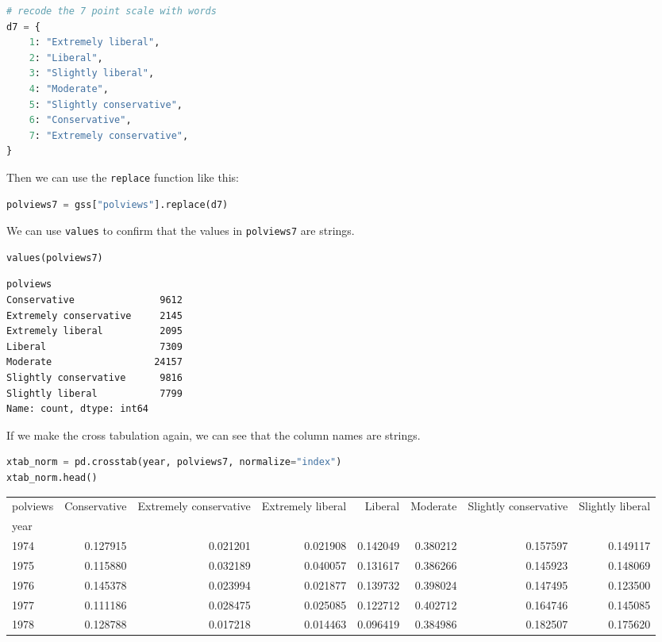 \begin{lstlisting}[language=Python,style=source]
# recode the 7 point scale with words
d7 = {
    1: "Extremely liberal",
    2: "Liberal",
    3: "Slightly liberal",
    4: "Moderate",
    5: "Slightly conservative",
    6: "Conservative",
    7: "Extremely conservative",
}
\end{lstlisting}

Then we can use the \passthrough{\lstinline!replace!} function like
this:

\begin{lstlisting}[language=Python,style=source]
polviews7 = gss["polviews"].replace(d7)
\end{lstlisting}

We can use \passthrough{\lstinline!values!} to confirm that the values
in \passthrough{\lstinline!polviews7!} are strings.

\begin{lstlisting}[language=Python,style=source]
values(polviews7)
\end{lstlisting}

\begin{lstlisting}[style=output]
polviews
Conservative               9612
Extremely conservative     2145
Extremely liberal          2095
Liberal                    7309
Moderate                  24157
Slightly conservative      9816
Slightly liberal           7799
Name: count, dtype: int64
\end{lstlisting}

If we make the cross tabulation again, we can see that the column names
are strings.

\begin{lstlisting}[language=Python,style=source]
xtab_norm = pd.crosstab(year, polviews7, normalize="index")
xtab_norm.head()
\end{lstlisting}

\begin{tabular}{lrrrrrrr}
\midrule
polviews & Conservative & Extremely conservative & Extremely liberal & Liberal & Moderate & Slightly conservative & Slightly liberal \\
year &  &  &  &  &  &  &  \\
\midrule
1974 & 0.127915 & 0.021201 & 0.021908 & 0.142049 & 0.380212 & 0.157597 & 0.149117 \\
1975 & 0.115880 & 0.032189 & 0.040057 & 0.131617 & 0.386266 & 0.145923 & 0.148069 \\
1976 & 0.145378 & 0.023994 & 0.021877 & 0.139732 & 0.398024 & 0.147495 & 0.123500 \\
1977 & 0.111186 & 0.028475 & 0.025085 & 0.122712 & 0.402712 & 0.164746 & 0.145085 \\
1978 & 0.128788 & 0.017218 & 0.014463 & 0.096419 & 0.384986 & 0.182507 & 0.175620 \\
\midrule
\end{tabular}

